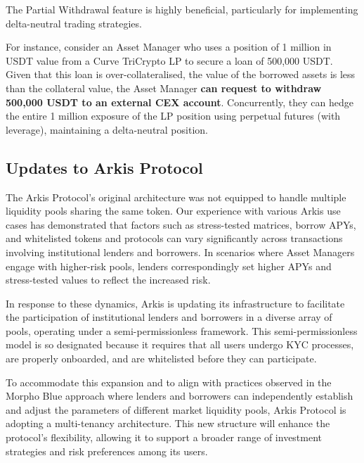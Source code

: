 \documentclass[conference]{IEEEtran}
\begin{document}
The Partial Withdrawal feature is highly beneficial, particularly for implementing delta-neutral trading strategies. 

For instance, consider an Asset Manager who uses a position of 1 million in USDT value from a Curve TriCrypto LP to secure a loan of 500,000 USDT. Given that this loan is over-collateralised, the value of the borrowed assets is less than the collateral value, the Asset Manager \textbf{can request to withdraw 500,000 USDT to an external CEX account}. Concurrently, they can hedge the entire 1 million exposure of the LP position using perpetual futures (with leverage), maintaining a delta-neutral position. 


\subsection{Updates to Arkis Protocol}

The Arkis Protocol's original architecture was not equipped to handle multiple liquidity pools sharing the same token. Our experience with various Arkis use cases has demonstrated that factors such as stress-tested matrices, borrow APYs, and whitelisted tokens and protocols can vary significantly across transactions involving institutional lenders and borrowers. In scenarios where Asset Managers engage with higher-risk pools, lenders correspondingly set higher APYs and stress-tested values to reflect the increased risk.

In response to these dynamics, Arkis is updating its infrastructure to facilitate the participation of institutional lenders and borrowers in a diverse array of pools, operating under a semi-permissionless framework. This semi-permissionless model is so designated because it requires that all users undergo KYC processes, are properly onboarded, and are whitelisted before they can participate.

To accommodate this expansion and to align with practices observed in the Morpho Blue approach where lenders and borrowers can independently establish and adjust the parameters of different market liquidity pools, Arkis Protocol is adopting a multi-tenancy architecture. This new structure will enhance the protocol’s flexibility, allowing it to support a broader range of investment strategies and risk preferences among its users.\cite{morpho-whitepaper}
\end{document}
